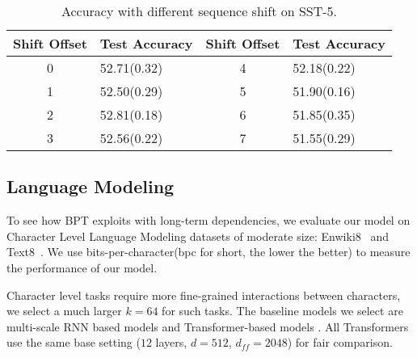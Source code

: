 \documentclass[11pt,a4paper]{article}
\begin{document}
\begin{table}[!htb]\small\setlength{\tabcolsep}{3pt}
\centering
\begin{tabular}{cl|cl}
\toprule
Shift Offset& Test Accuracy & Shift Offset& Test Accuracy\\
\midrule
0     & 52.71(0.32) & 4 & 52.18(0.22)  \\
1     & 52.50(0.29) & 5 &  51.90(0.16)  \\
2     & 52.81(0.18) & 6 & 51.85(0.35)  \\
3     & 52.56(0.22) & 7 & 51.55(0.29)  \\
\bottomrule
\end{tabular}
\caption{Accuracy with different sequence shift on SST-5.}
\label{tbl:shift}
\end{table}

\begin{comment}
\begin{table}[!htb]
\centering
\begin{tabular}{ll}
\toprule
shift & test accuracy \\
\midrule
0     & 52.71(0.32)   \\
1     & 52.50(0.29)   \\
2     & 52.81(0.18)   \\
3     & 52.56(0.22)   \\
4     & 52.18(0.22)   \\
5     & 51.90(0.16)   \\
6     & 51.85(0.35)   \\
\bottomrule
\end{tabular}
\end{table}
\end{comment}



\subsection{Language Modeling}
\label{sec:char}

To see how BPT exploits with long-term dependencies, we evaluate our model on Character Level Language Modeling datasets of moderate size: Enwiki8~\cite{mmllc:2009} and Text8~\cite{mmllc:2009}. We use bits-per-character(bpc for short, the lower the better) to measure the performance of our model.

Character level tasks require more fine-grained interactions between characters, we select a much larger $k=64$ for such tasks. The baseline models we select are multi-scale RNN based models \cite{ChungAB17, ZillySKS17, krause2016multiplicative} and Transformer-based models \cite{al2018character, dai2019transformer, sukhbaatar2019adaptive}. All Transformers use the same base setting ($12$ layers, $d=512$, $d_{ff}=2048$) for fair comparison.
\end{document}
